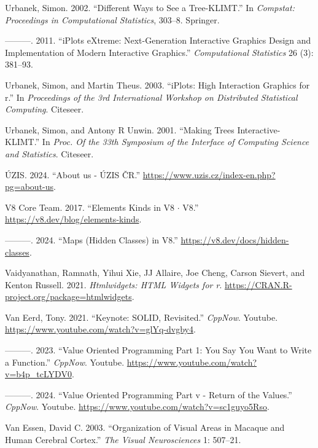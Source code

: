 \documentclass[
]{book}
\newlength{\cslhangindent}
\newenvironment{CSLReferences}[2] %
 {\begin{list}{}{%
  \setlength{\itemindent}{0pt}
  \setlength{\leftmargin}{0pt}
  \setlength{\parsep}{0pt}
  \ifodd #1
   \setlength{\leftmargin}{\cslhangindent}
   \setlength{\itemindent}{-1\cslhangindent}
  \fi
  \setlength{\itemsep}{#2\baselineskip}}}
 {\end{list}}
\theoremstyle{definition}
\theoremstyle{definition}
\theoremstyle{definition}
\theoremstyle{definition}
\theoremstyle{remark}
\begin{document}
\begin{CSLReferences}{1}{0}
Urbanek, Simon. 2002. {``Different Ways to See a Tree-KLIMT.''} In \emph{Compstat: Proceedings in Computational Statistics}, 303--8. Springer.

---------. 2011. {``iPlots eXtreme: Next-Generation Interactive Graphics Design and Implementation of Modern Interactive Graphics.''} \emph{Computational Statistics} 26 (3): 381--93.

Urbanek, Simon, and Martin Theus. 2003. {``iPlots: High Interaction Graphics for r.''} In \emph{Proceedings of the 3rd International Workshop on Distributed Statistical Computing}. Citeseer.

Urbanek, Simon, and Antony R Unwin. 2001. {``Making Trees Interactive-KLIMT.''} In \emph{Proc. Of the 33th Symposium of the Interface of Computing Science and Statistics}. Citeseer.

ÚZIS. 2024. {``{About us - ÚZIS ČR}.''} \url{https://www.uzis.cz/index-en.php?pg=about-us}.

V8 Core Team. 2017. {``Elements Kinds in V8 {\(\cdot\)} V8.''} \url{https://v8.dev/blog/elements-kinds}.

---------. 2024. {``Maps (Hidden Classes) in V8.''} \url{https://v8.dev/docs/hidden-classes}.

Vaidyanathan, Ramnath, Yihui Xie, JJ Allaire, Joe Cheng, Carson Sievert, and Kenton Russell. 2021. \emph{Htmlwidgets: HTML Widgets for r}. \url{https://CRAN.R-project.org/package=htmlwidgets}.

Van Eerd, Tony. 2021. {``Keynote: SOLID, Revisited.''} \emph{CppNow}. Youtube. \url{https://www.youtube.com/watch?v=glYq-dvgby4}.

---------. 2023. {``Value Oriented Programming Part 1: You Say You Want to Write a Function.''} \emph{CppNow}. Youtube. \url{https://www.youtube.com/watch?v=b4p_tcLYDV0}.

---------. 2024. {``Value Oriented Programming Part v - Return of the Values.''} \emph{CppNow}. Youtube. \url{https://www.youtube.com/watch?v=sc1guyo5Rso}.

Van Essen, David C. 2003. {``Organization of Visual Areas in Macaque and Human Cerebral Cortex.''} \emph{The Visual Neurosciences} 1: 507--21.


\end{CSLReferences}
\end{document}
